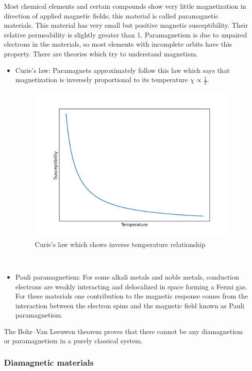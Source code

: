 Most chemical elements and certain compounds show very little magnetization in direction of applied magnetic fields; this material is called paramagnetic materials. This material has very small but positive magnetic susceptibility. Their relative permeability is slightly greater than 1. Paramagnetism is due to unpaired electrons in the materials, so most elements with incomplete orbits have this property. There are theories which try to understand magnetism. 
\begin{itemize}
\item Curie’s law: Paramagnets approximately follow this law which says that magnetization is inversely proportional to its temperature $\chi \propto \frac{1}{T}$.
\begin{figure}[hbt!]\centering
  \includegraphics[width=0.9\linewidth]{inverse.png}
  \caption{Curie's law which shows inverse temperature relationship}
\end{figure}
\\
\item Pauli paramagnetism: For some alkali metals and noble metals, conduction electrons are weakly interacting and delocalized in space forming a Fermi gas. For these materials one contribution to the magnetic response comes from the interaction between the electron spins and the magnetic field known as Pauli paramagnetism. \cite{wikipara}

\end{itemize}

The Bohr–Van Leeuwen theorem proves that there cannot be any diamagnetism or paramagnetism in a purely classical system.\cite{wikipara}

\subsubsection{Diamagnetic materials}

